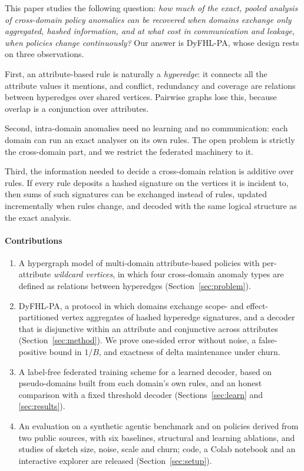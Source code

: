 \documentclass[preprint,12pt]{elsarticle}
\theoremstyle{definition}
\newcommand{\name}{DyFHL-PA\xspace}
\begin{document}
This paper studies the following question: \emph{how much of the exact, pooled analysis of cross-domain policy anomalies can be recovered when domains exchange only aggregated, hashed information, and at what cost in communication and leakage, when policies change continuously?} Our answer is \name, whose design rests on three observations.

First, an attribute-based rule is naturally a \emph{hyperedge}: it connects all the attribute values it mentions, and conflict, redundancy and coverage are relations between hyperedges over shared vertices. Pairwise graphs lose this, because overlap is a conjunction over attributes.

Second, intra-domain anomalies need no learning and no communication: each domain can run an exact analyser on its own rules. The open problem is strictly the cross-domain part, and we restrict the federated machinery to it.

Third, the information needed to decide a cross-domain relation is additive over rules. If every rule deposits a hashed signature on the vertices it is incident to, then sums of such signatures can be exchanged instead of rules, updated incrementally when rules change, and decoded with the same logical structure as the exact analysis.

\paragraph{Contributions}
\begin{enumerate}
\item A hypergraph model of multi-domain attribute-based policies with per-attribute \emph{wildcard vertices}, in which four cross-domain anomaly types are defined as relations between hyperedges (Section~\ref{sec:problem}).
\item \name, a protocol in which domains exchange scope- and effect-partitioned vertex aggregates of hashed hyperedge signatures, and a decoder that is disjunctive within an attribute and conjunctive across attributes (Section~\ref{sec:method}). We prove one-sided error without noise, a false-positive bound in $1/B$, and exactness of delta maintenance under churn.
\item A label-free federated training scheme for a learned decoder, based on pseudo-domains built from each domain's own rules, and an honest comparison with a fixed threshold decoder (Sections~\ref{sec:learn} and \ref{sec:results}).
\item An evaluation on a synthetic agentic benchmark and on policies derived from two public sources, with six baselines, structural and learning ablations, and studies of sketch size, noise, scale and churn; code, a Colab notebook and an interactive explorer are released (Section~\ref{sec:setup}).
\end{enumerate}
\end{document}
